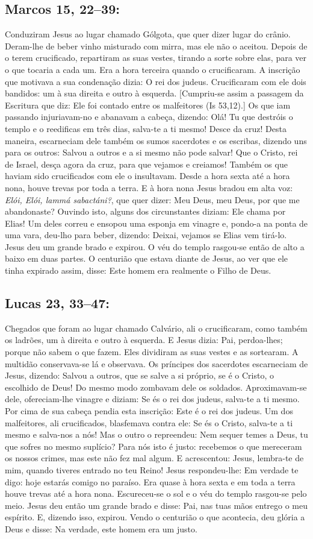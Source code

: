 \documentclass[10pt,a5paper]{book}
\newcommand{\from}[1]{\subsection*{#1}}
\begin{document}
\from{Marcos 15, 22--39:}

Conduziram Jesus ao lugar chamado Gólgota, que quer dizer lugar do crânio.
Deram-lhe de beber vinho misturado com mirra, mas ele não o aceitou.
Depois de o terem crucificado, repartiram as suas vestes, tirando a sorte sobre elas, para ver o que tocaria a cada um.
Era a hora terceira quando o crucificaram.
A inscrição que motivava a sua condenação dizia: O rei dos judeus.
Crucificaram com ele dois bandidos: um à sua direita e outro à esquerda.
[Cumpriu-se assim a passagem da Escritura que diz: Ele foi contado entre os malfeitores (Is 53,12).]
Os que iam passando injuriavam-no e abanavam a cabeça, dizendo:
Olá! Tu que destróis o templo e o reedificas em três dias,
salva-te a ti mesmo! Desce da cruz!
Desta maneira, escarneciam dele também os sumos sacerdotes e os escribas, dizendo uns para os outros:
Salvou a outros e a si mesmo não pode salvar!
Que o Cristo, rei de Israel, desça agora da cruz, para que vejamos e creiamos!
Também os que haviam sido crucificados com ele o insultavam.
Desde a hora sexta até a hora nona, houve trevas por toda a terra.
E à hora nona Jesus bradou em alta voz:
\emph{Elói, Elói, lammá sabactáni?}, que quer dizer: Meu Deus, meu Deus, por que me abandonaste?
Ouvindo isto, alguns dos circunstantes diziam: Ele chama por Elias!
Um deles correu e ensopou uma esponja em vinagre e, pondo-a na ponta de uma vara, deu-lho para beber, dizendo:
Deixai, vejamos se Elias vem tirá-lo.
Jesus deu um grande brado e expirou.
O véu do templo rasgou-se então de alto a baixo em duas partes.
O centurião que estava diante de Jesus, ao ver que ele tinha expirado assim, disse:
Este homem era realmente o Filho de Deus.

\from{Lucas 23, 33--47:}

Chegados que foram ao lugar chamado Calvário, ali o crucificaram, como também os ladrões, um à direita e outro à esquerda.
E Jesus dizia:
Pai, perdoa-lhes;
porque não sabem o que fazem.
Eles dividiram as suas vestes e as sortearam.
A multidão conservava-se lá e observava.
Os príncipes dos sacerdotes escarneciam de Jesus, dizendo:
Salvou a outros, que se salve a si próprio, se é o Cristo, o escolhido de Deus!
Do mesmo modo zombavam dele os soldados.
Aproximavam-se dele, ofereciam-lhe vinagre e diziam:
Se és o rei dos judeus, salva-te a ti mesmo.
Por cima de sua cabeça pendia esta inscrição:
Este é o rei dos judeus.
Um dos malfeitores, ali crucificados, blasfemava contra ele:
Se és o Cristo, salva-te a ti mesmo e salva-nos a nós!
Mas o outro o repreendeu:
Nem sequer temes a Deus, tu que sofres no mesmo suplício?
Para nós isto é justo:
recebemos o que mereceram os nossos crimes, mas este não fez mal algum.
E acrescentou:
Jesus, lembra-te de mim, quando tiveres entrado no teu Reino!
Jesus respondeu-lhe:
Em verdade te digo:
hoje estarás comigo no paraíso.
Era quase à hora sexta e em toda a terra houve trevas até a hora nona.
Escureceu-se o sol e o véu do templo rasgou-se pelo meio.
Jesus deu então um grande brado e disse:
Pai, nas tuas mãos entrego o meu espírito.
E, dizendo isso, expirou.
Vendo o centurião o que acontecia, deu glória a Deus e disse:
Na verdade, este homem era um justo.
\end{document}
